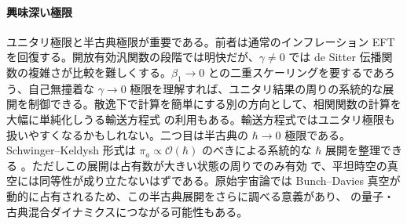 \documentclass[a4paper,11pt]{ltjsarticle}
\numberwithin{equation}{section}
\def\pia{\pi_{a}}
\begin{document}
\paragraph{興味深い極限} ユニタリ極限と半古典極限が重要である。前者は通常のインフレーション EFT \cite{Cheung:2007st} を回復する。開放有効汎関数の段階では明快だが、$\gamma\neq0$ では de Sitter 伝播関数の複雑さが比較を難しくする。$\beta_1\rightarrow0$ との二重スケーリングを要するであろう、自己無撞着な $\gamma\rightarrow0$ 極限を理解すれば、ユニタリ結果の周りの系統的な展開を制御できる。散逸下で計算を簡単にする別の方向として、相関関数の計算を大幅に単純化しうる輸送方程式 \cite{Dias:2016rjq, Ronayne:2017qzn, Werth:2023pfl, Pinol:2023oux, Werth:2024aui} の利用もある。輸送方程式ではユニタリ極限も扱いやすくなるかもしれない。二つ目は半古典の $\hbar\rightarrow0$ 極限である。Schwinger--Keldysh 形式は $\pia\propto\mathcal{O}(\hbar)$ のべきによる系統的な $\hbar$ 展開を整理できる \cite{Kamenev:2009jj}。ただしこの展開は占有数が大きい状態の周りでのみ有効 \cite{Radovskaya:2020lns} で、平坦時空の真空には同等性が成り立たないはずである。原始宇宙論では Bunch--Davies 真空が動的に占有されるため、この半古典展開をさらに調べる意義があり、\cite{Oppenheim:2020wdj, Oppenheim:2022xjr, Oppenheim:2022xjc, Oppenheim:2023izn, Layton:2023wdo, Oppenheim:2024iae, grudka2024renormalisation} の量子・古典混合ダイナミクスにつながる可能性もある。
\end{document}

